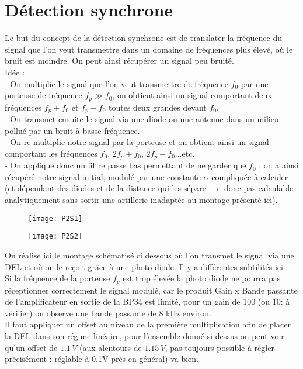 \documentclass[12pt,prb,aps,epsf]{report}
\begin{document}
\section{Détection synchrone}
Le but du concept de la détection synchrone est de translater la fréquence du signal que l'on veut transmettre dans un domaine de fréquences plus élevé, où le bruit est moindre. On peut ainsi récupérer un signal peu bruité.\\
Idée :\\
- On multiplie le signal que l'on veut transmettre de fréquence $f_0$ par une porteuse de fréquence $f_p \gg f_0$, on obtient ainsi un signal comportant deux fréquences $f_p+f_0$ et $f_p-f_0$ toutes deux grandes devant $f_0$.\\
- On transmet ensuite le signal via une diode ou une antenne dans un milieu pollué par un bruit à basse fréquence.\\
- On re-multiplie notre signal par la porteuse et on obtient ainsi un signal comportant les fréquences $f_0$, $2f_p+f_0$, $2f_p-f_0$...etc.\\
- On applique donc un filtre passe bas permettant de ne garder que $f_0$ : on a ainsi récupéré notre signal initial, modulé par une constante $\alpha$ compliquée à calculer (et dépendant des diodes et de la distance qui les sépare $\rightarrow$ donc pas calculable analytiquement sans sortir une artillerie inadaptée au montage présenté ici).\\
\begin{figure}[h]
	\centerline{\texttt{[image: P2S1]}}
\end{figure}
\begin{figure}
	\centerline{\texttt{[image: P2S2]}}
\end{figure}
On réalise ici le montage schématisé ci dessous où l'on transmet le signal via une DEL et où on le reçoit grâce à une photo-diode. Il y a différentes subtilités ici : \\

Si la fréquence de la porteuse $f_p$ est trop élevée la photo diode ne pourra pas réceptionner correctement le signal modulé, car le produit Gain x Bande passante de l'amplificateur en sortie de la BP34 est limité, pour un gain de 100 (ou 10: à vérifier) on observe une bande passante de 8 kHz environ.\\

Il faut appliquer un offset au niveau de la première multiplication afin de placer la DEL dans son régime linéaire, pour l'ensemble donné si dessus on peut voir qu'un offset de $1.1 \,V$ (aux alentours de $1.15\,V$, pas toujours possible à régler précisément : réglable à 0.1V près en général) va bien.\\
\end{document}
